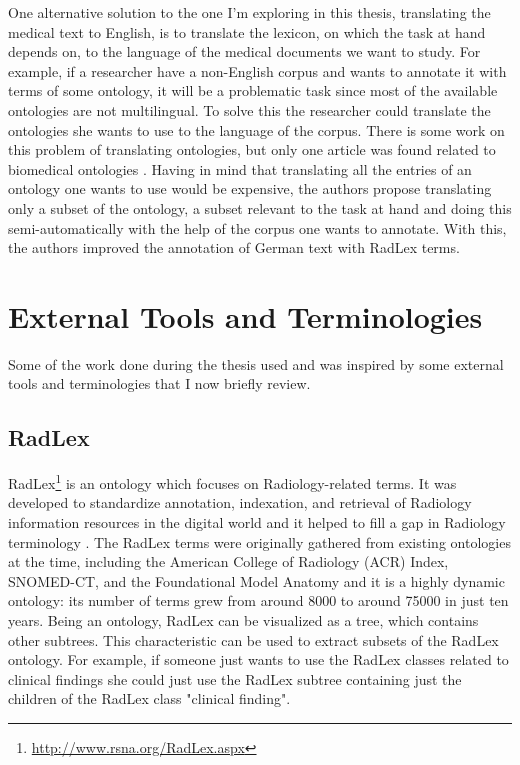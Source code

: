 One alternative solution to the one I'm exploring in this thesis, translating the medical text to English, is to translate the lexicon, on which the task at hand depends on, to the language of the medical documents we want to study. For example, if a researcher have a non-English corpus and wants to annotate it with terms of some ontology, it will be a problematic task since most of the available ontologies are not multilingual. To solve this the researcher could translate the ontologies she wants to use to the language of the corpus. There is some work on this problem of translating ontologies, but only one article was found related to biomedical ontologies \citep{Bretschneider}. Having in mind that translating all the entries of an ontology one wants to use would be expensive, the authors propose translating only a subset of the ontology, a subset relevant to the task at hand and doing this semi-automatically with the help of the corpus one wants to annotate. With this, the authors improved the annotation of German text with RadLex terms.

\section{External Tools and Terminologies}

Some of the work done during the thesis used and was inspired by some external tools and terminologies that I now briefly review.

\subsection{RadLex}
\label{Radlex}

RadLex\footnote{\url{http://www.rsna.org/RadLex.aspx}} is an ontology which focuses on Radiology-related terms. It was developed to standardize annotation, indexation, and retrieval of Radiology information resources in the digital world \citep{Langlotz2006} and it helped to fill a gap in Radiology terminology \citep{Langlotz2002, Woods2013}. The RadLex terms were originally gathered from existing ontologies at the time, including the American College of Radiology (ACR) Index, SNOMED-CT, and the Foundational Model Anatomy and it is a highly dynamic ontology: its number of terms grew from around 8000 to around 75000 in just ten years. Being an ontology, RadLex can be visualized as a tree, which contains other subtrees. This characteristic can be used to extract subsets of the RadLex ontology. For example, if someone just wants to use the RadLex classes related to clinical findings she could just use the RadLex subtree containing just the children of the RadLex class "clinical finding".

